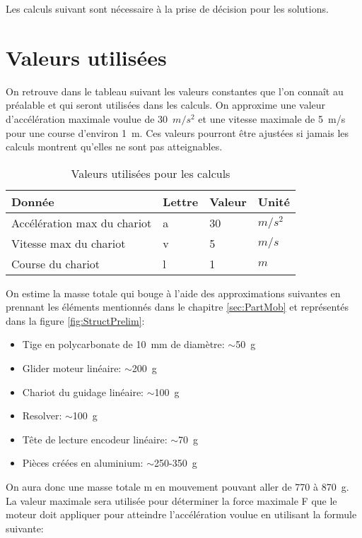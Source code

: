 Les calculs suivant sont nécessaire à la prise de décision pour les solutions.

\section{Valeurs utilisées}\label{sec:ValUtil}
On retrouve dans le tableau suivant les valeurs constantes que l'on connaît au préalable et qui seront utilisées dans les calculs.
On approxime une valeur d'accélération maximale voulue de 30~$m/s^2$ et une vitesse maximale de 5~m/s pour une course d'environ 1~m.
Ces valeurs pourront être ajustées si jamais les calculs montrent qu'elles ne sont pas atteignables.

\begin{table}[H]
    \centering
    \caption{Valeurs utilisées pour les calculs}
    \label{tab:ValUtil}
    \begin{tabular}{|l|l|l|l|}
        \hline
        \textbf{Donnée}             & \textbf{Lettre} & \textbf{Valeur} & \textbf{Unité} \\ \hline
        Accélération max du chariot & a               & 30              & $m/s^2$        \\ \hline
        Vitesse max du chariot      & v               & 5               & $m/s$          \\ \hline
        Course du chariot           & l               & 1               & $m$            \\ \hline
    \end{tabular}%
\end{table}

On estime la masse totale qui bouge à l'aide des approximations suivantes en prennant les éléments mentionnés dans le chapitre \ref{sec:PartMob}
et représentés dans la figure \ref{fig:StructPrelim}:
\begin{itemize}
    \item Tige en polycarbonate de 10~mm de diamètre: $\sim$50~g
    \item Glider moteur linéaire: $\sim$200~g
    \item Chariot du guidage linéaire: $\sim$100~g
    \item Resolver: $\sim$100~g
    \item Tête de lecture encodeur linéaire: $\sim$70~g
    \item Pièces créées en aluminium: $\sim$250-350~g
\end{itemize}

On aura donc une masse totale m en mouvement pouvant aller de 770 à 870~g. La valeur maximale sera utilisée pour déterminer la force maximale F
que le moteur doit appliquer pour atteindre l'accélération voulue en utilisant la formule suivante:


